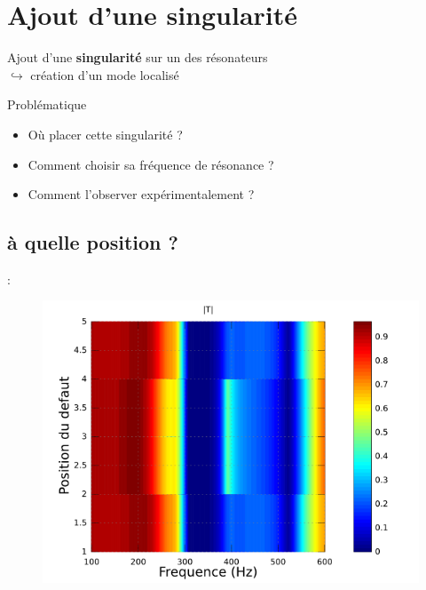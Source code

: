 \documentclass[12pt,xcolor=x11names,compress, notes=show]{beamer}%
\begin{document}
\section{Ajout d'une singularité}
\begin{frame}{\insertsectionhead}

	Ajout d'une \textbf{singularité} sur un des résonateurs\\
	  \hspace{1cm} $\hookrightarrow$ création d'un mode localisé \\

	\vspace{1cm}
	\begin{block}{Problématique}
		\begin{itemize}
			\item Où placer cette singularité ?
			\item Comment choisir sa fréquence de résonance ?
			\item Comment l'observer expérimentalement ?
		\end{itemize}
	\end{block}
 
\end{frame}

\subsection{à quelle position ?}
\begin{frame}{\insertsectionhead : \insertsubsectionhead}

\begin{figure}
	\centering
	\includegraphics[scale=0.4]{pos_singu.png}
\end{figure}
\end{frame}
\end{document}
